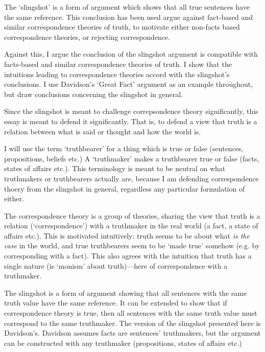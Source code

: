 The `slingshot' is a form of argument which shows that all true sentences have the same reference.
This conclusion has been used argue against fact-based and similar correspondence theories of truth, to motivate either non-facts based correspondence theories, or rejecting correspondence.

Against this, I argue the conclusion of the slingshot argument is compatible with facts-based and similar correspondence theories of truth.
I show that the intuitions leading to correspondence theories accord with the slingshot's conclusions.
I use Davidson's `Great Fact' argument as an example throughout, but draw conclusions concerning the slingshot in general.

Since the slingshot is meant to challenge correpsondence theory significantly, this essay is meant to defend it significantly.
That is, to defend a view that truth is a relation between what is said or thought and how the world is.

I will use the term `truthbearer' for a thing which is true or false (sentences, propositions, beliefs etc.)
A `truthmaker' makes a truthbearer true or false (facts, states of affairs etc.).
This terminology is meant to be neutral on what truthmakers or truthbearers actually are, because I am defending correspondence thoery from the slingshot in general, regardless any particular formulation of either.

The correspondence theory is a group of theories, sharing the view that truth is a relation (`correspondence') with a truthmaker in the real world (a fact, a state of affairs etc.).
This is motivated intuitively: truth seems to be about what \emph{is the case} in the world, and true truthbearers seem to be `made true' somehow (e.g. by corresponding with a fact).
This also agrees with the intuition that truth has a single nature (is `monism' about truth)---here of correspondence with a truthmaker.

The slingshot is a form of argument showing that all sentences with the same truth value have the same reference.
It can be extended to show that if correspondence theory is true, then all sentences with the same truth value must correspond to the same truthmaker.
The version of the slingshot presented here is Davidson's.
\parencite[753]{Davidson_1969}
Davidson assumes facts are sentences' truthmakers, but the argument can be constructed with any truthmaker (propositions, states of affairs etc.)
\parencite[752]{Davidson_1969}

